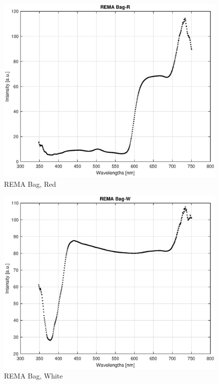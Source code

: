\begin{appendices}
\begin{figure}
    \centering
    \includegraphics[width = 12cm]{Images/appendix/remared.eps}
    \caption[$\; \:$REMA Bag, Red]{REMA Bag, Red}
    \label{fig:remared}
\end{figure}

\begin{figure}
    \centering
    \includegraphics[width = 12cm]{Images/appendix/remawhite.eps}
    \caption[$\; \:$REMA Bag, White]{REMA Bag, White}
    \label{fig:remawhite}
\end{figure}


\end{appendices}

